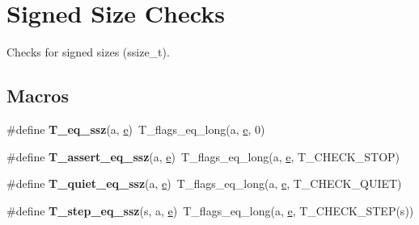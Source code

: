 \hypertarget{group__RTEMSTestFrameworkChecksSSZ}{}\section{Signed Size Checks}
\label{group__RTEMSTestFrameworkChecksSSZ}


Checks for signed sizes (ssize\+\_\+t).  


\subsection*{Macros}
\begin{DoxyCompactItemize}
\item 
\mbox{\label{group__RTEMSTestFrameworkChecksSSZ_ga0aaf241c599050bf7c03d2e93b511797}} 
\#define {\bfseries T\+\_\+eq\+\_\+ssz}(a,  \mbox{\hyperlink{sun4u_2tte_8h_a8b0b9ed08e0e18920ec2682f48228c27}{e}})~T\+\_\+flags\+\_\+eq\+\_\+long(a, \mbox{\hyperlink{sun4u_2tte_8h_a8b0b9ed08e0e18920ec2682f48228c27}{e}}, 0)
\item 
\mbox{\label{group__RTEMSTestFrameworkChecksSSZ_gaea88595938bf48ffc0c047fe44d01d77}} 
\#define {\bfseries T\+\_\+assert\+\_\+eq\+\_\+ssz}(a,  \mbox{\hyperlink{sun4u_2tte_8h_a8b0b9ed08e0e18920ec2682f48228c27}{e}})~T\+\_\+flags\+\_\+eq\+\_\+long(a, \mbox{\hyperlink{sun4u_2tte_8h_a8b0b9ed08e0e18920ec2682f48228c27}{e}}, T\+\_\+\+C\+H\+E\+C\+K\+\_\+\+S\+T\+OP)
\item 
\mbox{\label{group__RTEMSTestFrameworkChecksSSZ_gabf3d15a2fb9a10ac5af04d66777ad217}} 
\#define {\bfseries T\+\_\+quiet\+\_\+eq\+\_\+ssz}(a,  \mbox{\hyperlink{sun4u_2tte_8h_a8b0b9ed08e0e18920ec2682f48228c27}{e}})~T\+\_\+flags\+\_\+eq\+\_\+long(a, \mbox{\hyperlink{sun4u_2tte_8h_a8b0b9ed08e0e18920ec2682f48228c27}{e}}, T\+\_\+\+C\+H\+E\+C\+K\+\_\+\+Q\+U\+I\+ET)
\item 
\mbox{\label{group__RTEMSTestFrameworkChecksSSZ_ga803179f17dde3d4b66f5a06726dfe84d}} 
\#define {\bfseries T\+\_\+step\+\_\+eq\+\_\+ssz}(s,  a,  \mbox{\hyperlink{sun4u_2tte_8h_a8b0b9ed08e0e18920ec2682f48228c27}{e}})~T\+\_\+flags\+\_\+eq\+\_\+long(a, \mbox{\hyperlink{sun4u_2tte_8h_a8b0b9ed08e0e18920ec2682f48228c27}{e}}, T\+\_\+\+C\+H\+E\+C\+K\+\_\+\+S\+T\+EP(s))

\end{DoxyCompactItemize}

